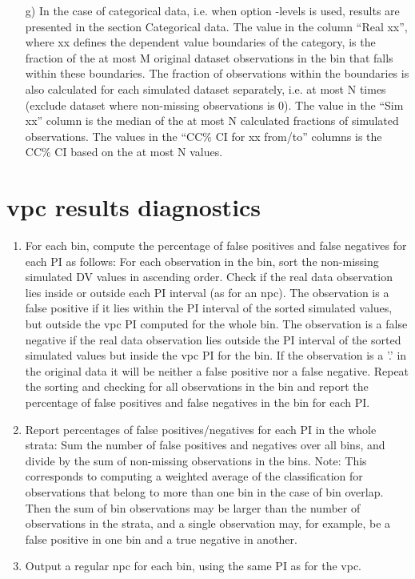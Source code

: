 \begin{itemize}
	\item[g)] In the case of categorical data, i.e. when option -levels is used, results are presented in the section Categorical data. The value in the column “Real xx”, where xx defines the dependent value boundaries of the category, is the fraction of the at most M original dataset observations in the bin that falls within these boundaries. The fraction of observations within the boundaries is also calculated for each simulated dataset separately, i.e. at most N times (exclude dataset where non-missing observations is 0). The value in the “Sim xx” column is the median of the at most N calculated fractions of simulated observations. The values in the “CC\% CI for xx from/to” columns is the CC\% CI based on the at most N values.
\end{itemize}

\section{vpc results diagnostics}

\begin{enumerate}
	\item For each bin, compute the percentage of false positives and false negatives for each PI as follows: 
For each observation in the bin, sort the non-missing simulated DV values in ascending order. Check if the real data observation lies inside or outside each PI interval (as for an npc). The observation is a false positive if it lies within the PI interval of the sorted simulated values, but outside the vpc PI computed for the whole bin. The observation is a false negative if the real data observation lies outside the PI interval of the sorted simulated values but inside the vpc PI for the bin. If the observation is a '.' in the original data it will be neither a false positive nor a false negative. Repeat the sorting and checking for all observations in the bin and report the percentage of false positives and false negatives in the bin for each PI.

	\item Report percentages of false positives/negatives for each PI in the whole strata:
Sum the number of false positives and negatives over all bins, and divide by the sum of non-missing observations in  the bins. Note: This corresponds to computing a weighted average of the classification for observations that belong to more than one bin in the case of bin overlap. Then the sum of bin observations may be larger than the number of observations in the strata, and a single observation may, for example, be a false positive in one bin and a true negative in another. 

	\item Output a regular npc for each bin, using the same PI as for the vpc.
\end{enumerate}


